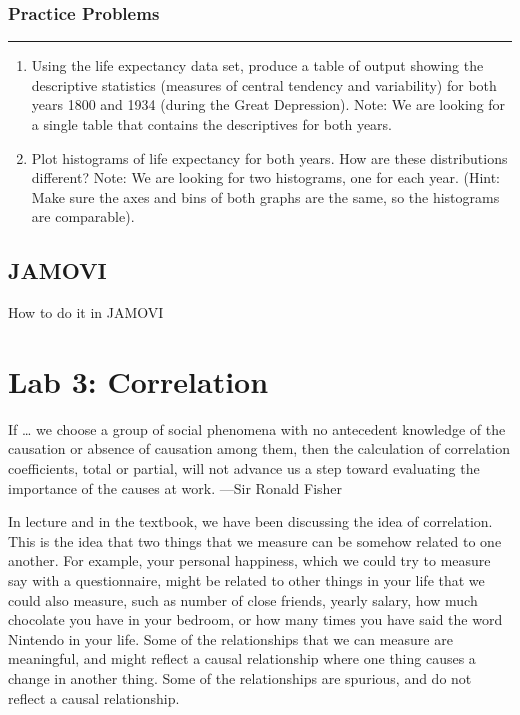 \documentclass[]{book}
\begin{document}
\subsection{Practice Problems}\label{practice-problems-2}

\begin{center}\rule{0.5\linewidth}{0.5pt}\end{center}

\begin{enumerate}
\def\labelenumi{\arabic{enumi}.}
\item
  Using the life expectancy data set, produce a table of output showing
  the descriptive statistics (measures of central tendency and
  variability) for both years 1800 and 1934 (during the Great
  Depression). Note: We are looking for a single table that contains the
  descriptives for both years.
\item
  Plot histograms of life expectancy for both years. How are these
  distributions different? Note: We are looking for two histograms, one
  for each year. (Hint: Make sure the axes and bins of both graphs are
  the same, so the histograms are comparable).
\end{enumerate}

\section{JAMOVI}\label{jamovi-2}

How to do it in JAMOVI

\chapter{Lab 3: Correlation}\label{lab-3-correlation}

{ If \ldots{} we choose a group of social phenomena with no antecedent
knowledge of the causation or absence of causation among them, then the
calculation of correlation coefficients, total or partial, will not
advance us a step toward evaluating the importance of the causes at
work. ---Sir Ronald Fisher }

In lecture and in the textbook, we have been discussing the idea of
correlation. This is the idea that two things that we measure can be
somehow related to one another. For example, your personal happiness,
which we could try to measure say with a questionnaire, might be related
to other things in your life that we could also measure, such as number
of close friends, yearly salary, how much chocolate you have in your
bedroom, or how many times you have said the word Nintendo in your life.
Some of the relationships that we can measure are meaningful, and might
reflect a causal relationship where one thing causes a change in another
thing. Some of the relationships are spurious, and do not reflect a
causal relationship.
\end{document}
